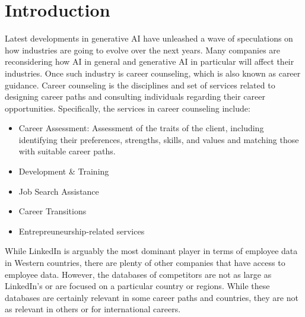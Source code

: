 \section{Introduction}
\label{sec:introduction}

Latest developments in generative AI have unleashed a wave of speculations on how industries are going to evolve
over the next years. Many companies are reconsidering how AI in general and generative AI in particular will affect
their industries. Once such industry is career counseling, which is also known as career guidance. Career counseling
is the disciplines and set of services related to designing career paths and consulting individuals regarding their
career opportunities. Specifically, the services in career counseling include:

\begin{itemize}
    \item Career Assessment: Assessment of the traits of the client, including identifying their preferences,
            strengths, skills, and values and matching those with suitable career paths.
    \item Development \& Training
    \item Job Search Assistance
    \item Career Transitions
    \item Entrepreuneurship-related services
\end{itemize}

While LinkedIn is arguably the most dominant player in terms of employee data in Western countries,
there are plenty of other companies that have access to employee data. However, the databases of competitors are
not as large as LinkedIn's or are focused on a particular country or regions. While these databases are certainly
relevant in some career paths and countries, they are not as relevant in others or for international careers.

